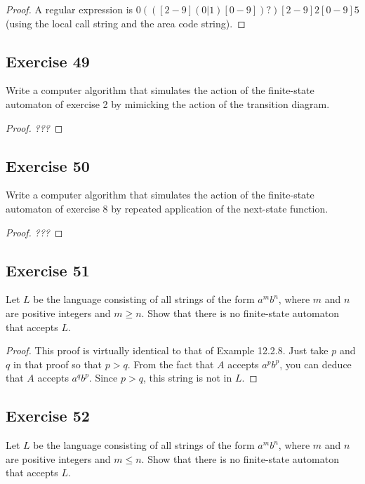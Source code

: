 \documentclass[14pt]{extarticle}
\begin{document}
\begin{proof}
A regular expression is \(0(([2-9](0|1)[0-9])?)[2-9]{2}[0-9]{5}\) (using the local call string and the area code string).
\end{proof}

\subsection{Exercise 49}
Write a computer algorithm that simulates the action of the finite-state automaton of exercise 2 by mimicking the action 
of the transition diagram.

\begin{proof}
{\it ???}
\end{proof}

\subsection{Exercise 50}
Write a computer algorithm that simulates the action of the finite-state automaton of exercise 8 by repeated application 
of the next-state function.

\begin{proof}
{\it ???}
\end{proof}

\subsection{Exercise 51}
Let \(L\) be the language consisting of all strings of the form \(a^mb^n\), where \(m\) and \(n\) are positive integers 
and \(m \geq n\). Show that there is no finite-state automaton that accepts \(L\).

\begin{proof}
This proof is virtually identical to that of Example 12.2.8. Just take \(p\) and \(q\) in that proof so that \(p > q\). 
From the fact that \(A\) accepts \(a^pb^p\), you can deduce that \(A\) accepts \(a^qb^p\). Since \(p > q\), this string is 
not in \(L\).
\end{proof}

\subsection{Exercise 52}
Let \(L\) be the language consisting of all strings of the form \(a^mb^n\), where \(m\) and \(n\) are positive integers 
and \(m \leq n\). Show that there is no finite-state automaton that accepts \(L\).
\end{document}
